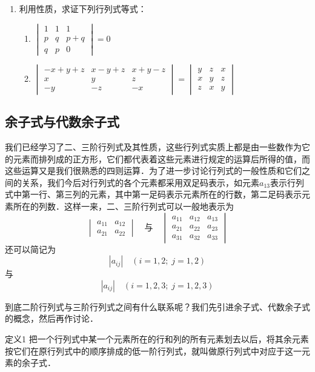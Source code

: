 \begin{ex}
\begin{enumerate}
\item 利用性质，求证下列行列式等式：
\begin{enumerate}
    \item $\begin{vmatrix}
        1&1&1\\p&q&p+q\\q&p&0
    \end{vmatrix}=0$
    \item $\begin{vmatrix}
        -x+y+z&x-y+z&x+y-z\\
        x&y&z\\
        -y&-z&-x
    \end{vmatrix}=\begin{vmatrix}
        y&z&x\\x&y&z\\z&x&y
    \end{vmatrix}$
\end{enumerate}
\end{enumerate}
\end{ex}

\subsection{余子式与代数余子式}

我们已经学习了二、三阶行列式及其性质，这些行列式实质上都是由一些数作为它的元素而排列成的正方形，它们都代表着这些元素进行规定的运算后所得的值，而这些运算又是我们很熟悉的四则运算．为了进一步讨论行列式的一般性质和它们之间的关系，我们今后对行列式的各个元素都采用双足码表示，如元素$a_{13}$表示行列式中第一行、第三列的元素，其中第一足码表示元素所在的行数，第二足码表示元素所在的列数．这样一来，二、三阶行列式可以一般地表示为
\[\begin{vmatrix}
    a_{11}&a_{12}\\a_{21}&a_{22}
\end{vmatrix}\quad\text{与}\quad  \begin{vmatrix}
    a_{11}&a_{12}&a_{13}\\
    a_{21}&a_{22}&a_{23}\\
    a_{31}&a_{32}&a_{33}
\end{vmatrix}\]
还可以简记为
\[|a_{ij}|\quad (i=1,2;\; j=1,2)\]
与
\[|a_{ij}|\quad (i=1,2,3;\; j=1,2,3)\]

到底二阶行列式与三阶行列式之间有什么联系呢？我们先引进余子式、代数余子式的概念，然后再作讨论．

\begin{blk}{定义1}
    把一个行列式中某一个元素所在的行和列的所有元素划去以后，将其余元素按它们在原行列式中的顺序排成的低一阶行列式，就叫做原行列式中对应于这一元素的余子式．
\end{blk}

